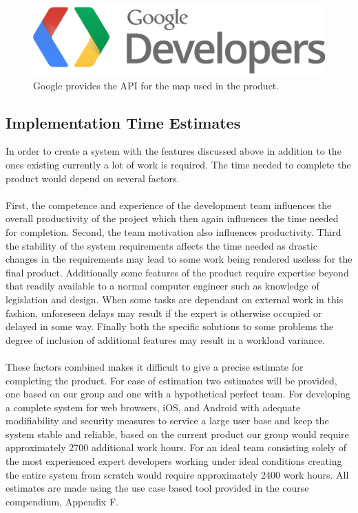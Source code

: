 \begin{figure}[ht!]
  \centering
  \includegraphics[width=\linewidth]{./FurtherWork/img/GoogleDevelopersLogo}
  \caption{Google provides the API for the map used in the product.}
  \label{fig:FurtherGoogleDevelopersLogo}
\end{figure}

\subsection{Implementation Time Estimates}
\label{subsec:FurtherRequiredEstimate}

In order to create a system with the features discussed above in addition to the ones existing currently a lot of work is required. The time needed to complete the product would depend on several factors. 
\paragraph{} First, the competence and experience of the development team influences the overall productivity of the project which then again influences the time needed for completion. Second, the team motivation also influences productivity. Third the stability of the system requirements affects the time needed as drastic changes in the requirements may lead to some work being rendered useless for the final product. Additionally some features of the product require expertise beyond that readily available to a normal computer engineer such as knowledge of legislation and design. When some tasks are dependant on external work in this fashion, unforeseen delays may result if the expert is otherwise occupied or delayed in some way. Finally both the specific solutions to some problems the degree of inclusion of additional features may result in a workload variance. 
\paragraph{} These factors combined makes it difficult to give a precise estimate for completing the product. For ease of estimation two estimates will be provided, one based on our group and one with a hypothetical perfect team. For developing a complete system for web browsers, iOS, and Android with adequate modifiability and security measures to service a large user base and keep the system stable and reliable, based on the current product our group would require approximately 2700 additional work hours. For an ideal team consisting solely of the most experienced expert developers working under ideal conditions creating the entire system from scratch would require approximately 2400 work hours. All estimates are made using the use case based tool provided in the course compendium, Appendix F. \cite{booklet:CDPCompendium}
